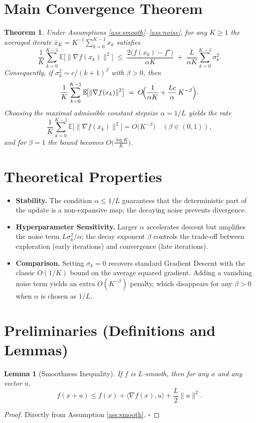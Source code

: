 \documentclass[11pt]{article}
\newtheorem{theorem}{Theorem}
\newtheorem{lemma}{Lemma}
\newcommand{\E}{\mathbb{E}}
\begin{document}
\section*{Main Convergence Theorem}
\begin{theorem}\label{thm:main}
Under Assumptions \ref{ass:smooth}–\ref{ass:noise}, for any $K\ge 1$ the averaged iterate $\bar x_{K}=K^{-1}\sum_{k=0}^{K-1}x_{k}$ satisfies
\[
\frac{1}{K}\sum_{k=0}^{K-1}\E\!\bigl[\|\nabla f(x_{k})\|^{2}\bigr]
\;\le\;
\frac{2\bigl(f(x_{0})-f^{\star}\bigr)}{\alpha K}
\;+\;
\frac{L}{\alpha K}\sum_{k=0}^{K-1}\sigma_{k}^{2}.
\tag{*}
\]
Consequently, if $\sigma_{k}^{2}=c/(k+1)^{\beta}$ with $\beta>0$, then
\[
\frac{1}{K}\sum_{k=0}^{K-1}\E\!\bigl[\|\nabla f(x_{k})\|^{2}\bigr]
\;=\;O\!\Bigl(\frac{1}{\alpha K}+\frac{L c}{\alpha}\,K^{-\beta}\Bigr).
\]
Choosing the maximal admissible constant stepsize $\alpha=1/L$ yields the rate
\[
\frac{1}{K}\sum_{k=0}^{K-1}\E\!\bigl[\|\nabla f(x_{k})\|^{2}\bigr]
=O\!\bigl(K^{-\beta}\bigr)
\quad(\beta\in(0,1)),
\]
and for $\beta=1$ the bound becomes $O\!\bigl(\tfrac{\log K}{K}\bigr)$.
\end{theorem}

\section*{Theoretical Properties}
\begin{itemize}
\item \textbf{Stability.} The condition $\alpha\le 1/L$ guarantees that the deterministic part of the update is a non‑expansive map; the decaying noise prevents divergence.
\item \textbf{Hyperparameter Sensitivity.} Larger $\alpha$ accelerates descent but amplifies the noise term $L\sigma_{k}^{2}/\alpha$; the decay exponent $\beta$ controls the trade‑off between exploration (early iterations) and convergence (late iterations).
\item \textbf{Comparison.} Setting $\sigma_{k}=0$ recovers standard Gradient Descent with the classic $O(1/K)$ bound on the average squared gradient. Adding a vanishing noise term yields an extra $O(K^{-\beta})$ penalty, which disappears for any $\beta>0$ when $\alpha$ is chosen as $1/L$.
\end{itemize}

\section*{Preliminaries (Definitions and Lemmas)}
\begin{lemma}[Smoothness Inequality]\label{lem:smooth}
If $f$ is $L$‑smooth, then for any $x$ and any vector $u$,
\[
f(x+u)\le f(x)+\langle\nabla f(x),u\rangle+\frac{L}{2}\|u\|^{2}.
\]
\end{lemma}
\begin{proof}
Directly from Assumption \ref{ass:smooth}. \hfill $\square$
\end{proof}
\end{document}
